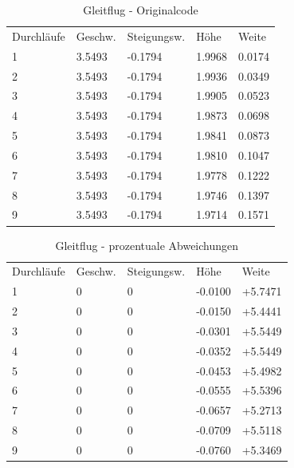 \documentclass[a4paper,12pt]{scrartcl}
\begin{document}
\begin{table}
\centering
\caption{Gleitflug - Originalcode}
\begin{tabular}{lllll}
Durchläufe & Geschw. & Steigungsw. & Höhe   & Weite   \\
1          & 3.5493  & -0.1794     & 1.9968 & 0.0174  \\
2          & 3.5493  & -0.1794     & 1.9936 & 0.0349  \\
3          & 3.5493  & -0.1794     & 1.9905 & 0.0523  \\
4          & 3.5493  & -0.1794     & 1.9873 & 0.0698  \\
5          & 3.5493  & -0.1794     & 1.9841 & 0.0873  \\
6          & 3.5493  & -0.1794     & 1.9810 & 0.1047  \\
7          & 3.5493  & -0.1794     & 1.9778 & 0.1222  \\
8          & 3.5493  & -0.1794     & 1.9746 & 0.1397  \\
9          & 3.5493  & -0.1794     & 1.9714 & 0.1571 
\end{tabular}
\end{table}
\begin{table}
\centering
\caption{Gleitflug - prozentuale Abweichungen}
\begin{tabular}{lllll}
Durchläufe & Geschw. & Steigungsw. & Höhe   & Weite   \\
1          & 0  & 0     & -0.0100 & +5.7471  \\
2          & 0  & 0     & -0.0150 & +5.4441  \\
3          & 0  & 0     & -0.0301 & +5.5449  \\
4          & 0  & 0     & -0.0352 & +5.5449  \\
5          & 0  & 0     & -0.0453 & +5.4982  \\
6          & 0  & 0     & -0.0555 & +5.5396  \\
7          & 0  & 0     & -0.0657 & +5.2713  \\
8          & 0  & 0     & -0.0709 & +5.5118  \\
9          & 0  & 0     & -0.0760 & +5.3469 
\end{tabular}
\end{table}
\end{document}
